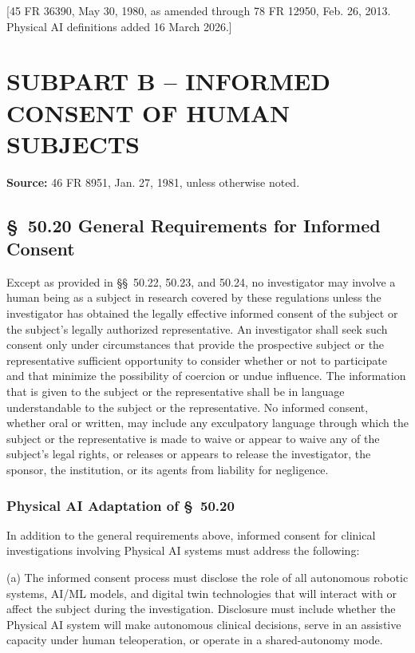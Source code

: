 \documentclass[11pt]{article}
\begin{document}
[45 FR 36390, May 30, 1980, as amended through 78 FR 12950, Feb. 26, 2013. Physical AI definitions added 16 March 2026.]

\section{SUBPART B -- INFORMED CONSENT OF HUMAN SUBJECTS}

\textbf{Source:} 46 FR 8951, Jan. 27, 1981, unless otherwise noted.

\subsection{\S~50.20 General Requirements for Informed Consent}

Except as provided in \S\S~50.22, 50.23, and 50.24, no investigator may involve a human being as a subject in research covered by these regulations unless the investigator has obtained the legally effective informed consent of the subject or the subject's legally authorized representative. An investigator shall seek such consent only under circumstances that provide the prospective subject or the representative sufficient opportunity to consider whether or not to participate and that minimize the possibility of coercion or undue influence. The information that is given to the subject or the representative shall be in language understandable to the subject or the representative. No informed consent, whether oral or written, may include any exculpatory language through which the subject or the representative is made to waive or appear to waive any of the subject's legal rights, or releases or appears to release the investigator, the sponsor, the institution, or its agents from liability for negligence.

\subsubsection{Physical AI Adaptation of \S~50.20}

In addition to the general requirements above, informed consent for clinical investigations involving Physical AI systems must address the following:

(a) The informed consent process must disclose the role of all autonomous robotic systems, AI/ML models, and digital twin technologies that will interact with or affect the subject during the investigation. Disclosure must include whether the Physical AI system will make autonomous clinical decisions, serve in an assistive capacity under human teleoperation, or operate in a shared-autonomy mode.
\end{document}
